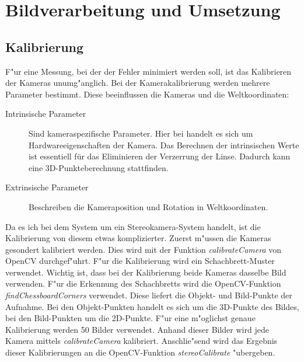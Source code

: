 \chapter{Bildverarbeitung und Umsetzung}
\label{cha:verarbeitungumsetzung}

\section{Kalibrierung}
\label{sec:kalibrierung}

F"ur eine Messung, bei der der Fehler minimiert werden soll, ist das Kalibrieren der Kameras unumg"anglich. Bei der Kamerakalibrierung werden mehrere Parameter bestimmt. Diese beeinflussen die Kameras und die Weltkoordinaten:

\begin{description}
	\item[Intrinsische Parameter]
	Sind kameraspezifische Parameter. Hier bei handelt es sich um Hardwareeigenschaften der Kamera.\newline
	Das Berechnen der intrinsischen Werte ist essentiell für das Eliminieren der Verzerrung der Linse. Dadurch kann eine 3D-Punkteberechnung stattfinden.
	
	\item[Extrinsische Parameter]
	Beschreiben die Kameraposition und Rotation in Weltkoordinaten.
\end{description}

\noindent Da es ich bei dem System um ein Stereokamera-System handelt, ist die Kalibrierung von diesem etwas komplizierter.\newline
Zuerst m"ussen die Kameras gesondert kalibriert werden. Dies wird mit der Funktion \textit{calibrateCamera} von OpenCV durchgef"uhrt. F"ur die Kalibrierung wird ein Schachbrett-Muster verwendet. Wichtig ist, dass bei der Kalibrierung beide Kameras dasselbe Bild verwenden. F"ur die Erkennung des Schachbretts wird die OpenCV-Funktion \textit{findChessboardCorners} verwendet. Diese liefert die Objekt- und Bild-Punkte der Aufnahme. Bei den Objekt-Punkten handelt es sich um die 3D-Punkte des Bildes, bei den Bild-Punkten um die 2D-Punkte\cite{OcvD}.
\noindent F"ur eine m"oglichst genaue Kalibrierung werden 50 Bilder verwendet. Anhand dieser Bilder wird jede Kamera mittels \textit{calibrateCamera} kalibriert. Anschlie"send wird das Ergebnis dieser Kalibrierungen an die OpenCV-Funktion \textit{stereoCalibrate} "ubergeben.




